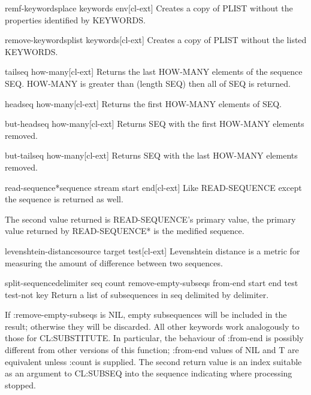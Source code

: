 \begin{macro}{remf-keywords}{place \rest keywords \env env}[cl-ext]
  Creates a copy of PLIST without the properties identified by KEYWORDS.
\end{macro}

\begin{function}{remove-keywords}{plist \rest keywords}[cl-ext]
  Creates a copy of PLIST without the listed KEYWORDS.
\end{function}

\begin{function}{tail}{seq \op how-many}[cl-ext]
  Returns the last HOW-MANY elements of the sequence SEQ. HOW-MANY is
  greater than (length SEQ) then all of SEQ is returned.
\end{function}

\begin{function}{head}{seq \op how-many}[cl-ext]
  Returns the first HOW-MANY elements of SEQ.
\end{function}

\begin{function}{but-head}{seq \op how-many}[cl-ext]
  Returns SEQ with the first HOW-MANY elements removed.
\end{function}

\begin{function}{but-tail}{seq \op how-many}[cl-ext]
  Returns SEQ with the last HOW-MANY elements removed.
\end{function}

\begin{function}{read-sequence*}{sequence stream \key start end}[cl-ext]
  Like READ-SEQUENCE except the sequence is returned as well.

The second value returned is READ-SEQUENCE's primary value, the
primary value returned by READ-SEQUENCE* is the medified
sequence.
\end{function}

\begin{function}{levenshtein-distance}{source target \key test}[cl-ext]
  Levenshtein distance is a metric for measuring the amount of
  difference between two sequences.
\end{function}

\begin{function}{split-sequence}{delimiter seq \key count
    remove-empty-subseqs from-end start end test test-not key}
  Return a list of subsequences in seq delimited by delimiter.

If :remove-empty-subseqs is NIL, empty subsequences will be included
in the result; otherwise they will be discarded.  All other keywords
work analogously to those for CL:SUBSTITUTE.  In particular, the
behaviour of :from-end is possibly different from other versions of
this function; :from-end values of NIL and T are equivalent unless
:count is supplied. The second return value is an index suitable as an
argument to CL:SUBSEQ into the sequence indicating where processing
stopped.
\end{function}

